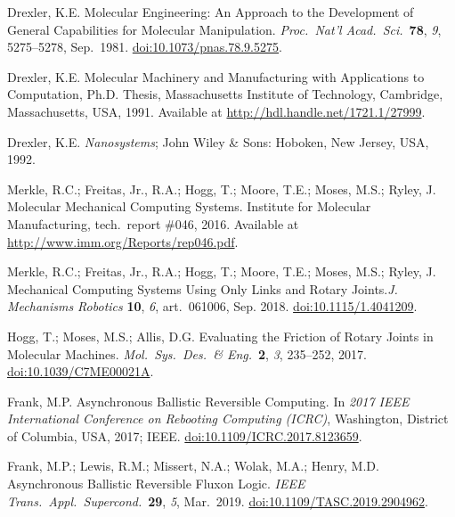 \documentclass[preprints,article,accept,moreauthors,pdftex]{Definitions/mdpi}
\begin{document}
\begin{thebibliography}{999}
Drexler, K.E\@. Molecular Engineering: An Approach to the Development of General Capabilities for Molecular Manipulation. {\em Proc.\ Nat'l Acad.\ Sci.}\ {\bf 78}, {\em 9}, 5275--5278, Sep.\ 1981. \href{https://doi.org/10.1073/pnas.78.9.5275}{doi:10.1073/pnas.78.9.5275}.

Drexler, K.E\@. Molecular Machinery and Manufacturing with Applications to Computation, Ph.D. Thesis, Massachusetts Institute of Technology, Cambridge, Massachusetts, USA, 1991. Available at \href{http://hdl.handle.net/1721.1/27999}{http://hdl.handle.net/1721.1/27999}.

Drexler, K.E\@. \emph{Nanosystems}; John Wiley \& Sons: Hoboken, New Jersey, USA, 1992.

Merkle, R.C.; Freitas, Jr., R.A.; Hogg, T.; Moore, T.E.; Moses, M.S.; Ryley, J\@. Molecular Mechanical Computing Systems. Institute for Molecular Manufacturing, tech.\ report \#046, 2016. Available at \href{http://www.imm.org/Reports/rep046.pdf}{http://www.imm.org/Reports/rep046.pdf}.

Merkle, R.C.; Freitas, Jr., R.A.; Hogg, T.; Moore, T.E.; Moses, M.S.; Ryley, J\@. Mechanical Computing Systems Using Only Links and Rotary Joints.{\em J. Mechanisms Robotics} {\bf 10}, {\em 6}, art.\ 061006, Sep. 2018.  \href{https://doi.org/10.1115/1.4041209}{doi:10.1115/1.4041209}.

Hogg, T.; Moses, M.S.; Allis, D.G\@. Evaluating the Friction of Rotary Joints in Molecular Machines. {\em Mol.\ Sys.\ Des.\ \& Eng.}\ {\bf 2}, {\em 3}, 235--252, 2017. \href{https://doi.org/10.1039/C7ME00021A}{doi:10.1039/C7ME00021A}.

Frank, M.P\@. Asynchronous Ballistic Reversible Computing. In \emph{2017 IEEE International Conference on Rebooting Computing (ICRC)}, Washington, District of Columbia, USA, 2017; IEEE. \href{https://doi.org/10.1109/ICRC.2017.8123659}{doi:10.1109/ICRC.2017.8123659}.

Frank, M.P.; Lewis, R.M.; Missert, N.A.; Wolak, M.A.; Henry, M.D\@. Asynchronous Ballistic Reversible Fluxon Logic. {\em IEEE Trans.\ Appl.\ Supercond.}\ {\bf 29}, {\em 5}, Mar.\ 2019. \href{https://doi.org/10.1109/TASC.2019.2904962}{doi:10.1109/TASC.2019.2904962}.


\end{thebibliography}
\end{document}
